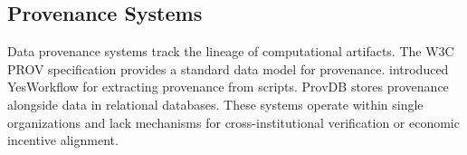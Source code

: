 \subsection{Provenance Systems}

Data provenance systems track the lineage of computational artifacts.
The W3C PROV specification \citep{moreau2013prov} provides a standard data model for provenance.
\citet{mcphillips2015yesworkflow} introduced YesWorkflow for extracting provenance from scripts.
ProvDB \citep{miao2018provdb} stores provenance alongside data in relational databases.
These systems operate within single organizations and lack mechanisms for cross-institutional verification or economic incentive alignment.

